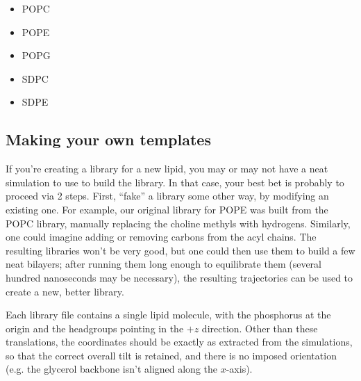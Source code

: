 \documentclass[12pt]{article}
\begin{document}
\begin{itemize}
    \item POPC
    \item POPE
    \item POPG
    \item SDPC
    \item SDPE
\end{itemize}

\subsection{Making your own templates}
\label{ss:diy}

If you're creating a library for a new lipid, you may or may not have a neat
simulation to use to build the library.  In that case, your best bet is
probably to proceed via 2 steps.  First, ``fake'' a library some other way,
by modifying an existing one.  For example, our original library for POPE was
built from the POPC library, manually replacing the choline methyls with
hydrogens.  Similarly, one could imagine adding or removing carbons from the
acyl chains.  The resulting libraries won't be very good, but one could then
use them to build a few neat bilayers; after running them long enough to
equilibrate them (several hundred nanoseconds may be necessary), the
resulting trajectories can be used to create a new, better library.

Each library file contains a single lipid molecule, with the phosphorus at
the origin and the headgroups pointing in the $+z$ direction.  Other than
these translations, the coordinates should be exactly as extracted from the
simulations, so that the correct overall tilt is retained, and there is no
imposed orientation (e.g. the glycerol backbone isn't aligned along the
$x$-axis).  
\end{document}
